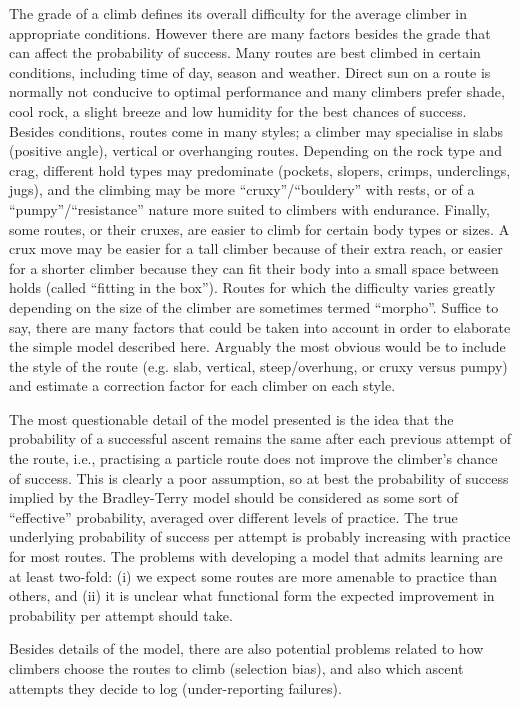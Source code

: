 \documentclass[12pt]{article}
\begin{document}
The grade of a climb defines its overall difficulty for the average climber in appropriate conditions. However there are many factors besides the grade that can affect the probability of success. Many routes are best climbed in certain conditions, including time of day, season and weather. Direct sun on a route is normally not conducive to optimal performance and many climbers prefer shade, cool rock, a slight breeze and low humidity for the best chances of success. Besides conditions, routes come in many styles; a climber may specialise in slabs (positive angle), vertical or overhanging routes. Depending on the rock type and crag, different hold types may predominate (pockets, slopers, crimps, underclings, jugs), and the climbing may be more ``cruxy''/``bouldery'' with rests, or of a ``pumpy''/``resistance'' nature more suited to climbers with endurance. Finally, some routes, or their cruxes, are easier to climb for certain body types or sizes. A crux move may be easier for a tall climber because of their extra reach, or easier for a shorter climber because they can fit their body into a small space between holds (called ``fitting in the box''). Routes for which the difficulty varies greatly depending on the size of the climber are sometimes termed ``morpho''. Suffice to say, there are many factors that could be taken into account in order to elaborate the simple model described here. Arguably the most obvious would be to include the style of the route (e.g. slab, vertical, steep/overhung, or cruxy versus pumpy) and estimate a correction factor for each climber on each style.

The most questionable detail of the model presented is the idea that the probability of a successful ascent remains the same after each previous attempt of the route, i.e., practising a particle route does not improve the climber's chance of success. This is clearly a poor assumption, so at best the probability of success implied by the Bradley-Terry model should be considered as some sort of ``effective'' probability, averaged over different levels of practice. The true underlying probability of success per attempt is probably increasing with practice for most routes. The problems with developing a model that admits learning are at least two-fold: (i) we expect some routes are more amenable to practice than others, and (ii) it is unclear what functional form the expected improvement in probability per attempt should take.

Besides details of the model, there are also potential problems related to how climbers choose the routes to climb (selection bias), and also which ascent attempts they decide to log (under-reporting failures).
\end{document}
